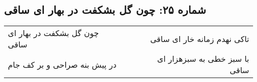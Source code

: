 \begin{center}
\section*{شماره ۲۵: چون گل بشکفت در بهار ای ساقی}
\label{sec:025}
\begin{longtable}{l p{0.5cm} r}
چون گل بشکفت در بهار ای ساقی
&&
تاکی نهدم زمانه خار ای ساقی
\\
در پیش بنه صراحی و بر کف جام
&&
با سبز خطی به سبزهزار ای ساقی
\\
\end{longtable}
\end{center}
